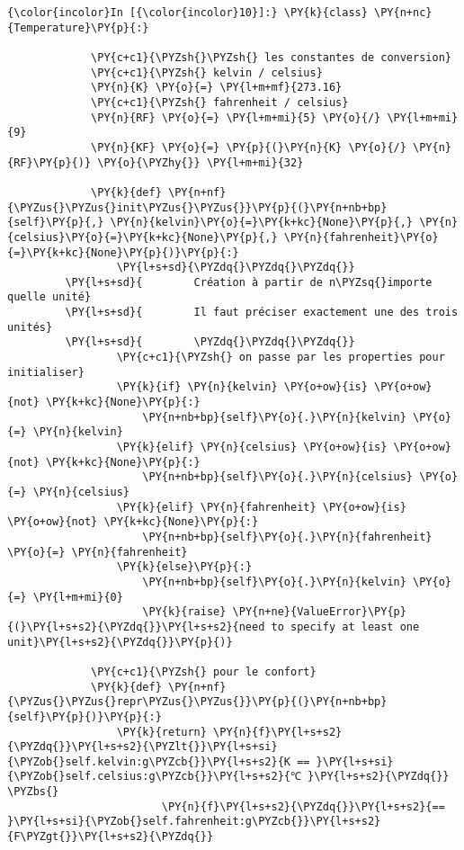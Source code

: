     \begin{Verbatim}[commandchars=\\\{\},frame=single,framerule=0.3mm,rulecolor=\color{cellframecolor}]
{\color{incolor}In [{\color{incolor}10}]:} \PY{k}{class} \PY{n+nc}{Temperature}\PY{p}{:}
         
             \PY{c+c1}{\PYZsh{}\PYZsh{} les constantes de conversion}
             \PY{c+c1}{\PYZsh{} kelvin / celsius}
             \PY{n}{K} \PY{o}{=} \PY{l+m+mf}{273.16}
             \PY{c+c1}{\PYZsh{} fahrenheit / celsius}
             \PY{n}{RF} \PY{o}{=} \PY{l+m+mi}{5} \PY{o}{/} \PY{l+m+mi}{9}
             \PY{n}{KF} \PY{o}{=} \PY{p}{(}\PY{n}{K} \PY{o}{/} \PY{n}{RF}\PY{p}{)} \PY{o}{\PYZhy{}} \PY{l+m+mi}{32}
         
             \PY{k}{def} \PY{n+nf}{\PYZus{}\PYZus{}init\PYZus{}\PYZus{}}\PY{p}{(}\PY{n+nb+bp}{self}\PY{p}{,} \PY{n}{kelvin}\PY{o}{=}\PY{k+kc}{None}\PY{p}{,} \PY{n}{celsius}\PY{o}{=}\PY{k+kc}{None}\PY{p}{,} \PY{n}{fahrenheit}\PY{o}{=}\PY{k+kc}{None}\PY{p}{)}\PY{p}{:}
                 \PY{l+s+sd}{\PYZdq{}\PYZdq{}\PYZdq{}}
         \PY{l+s+sd}{        Création à partir de n\PYZsq{}importe quelle unité}
         \PY{l+s+sd}{        Il faut préciser exactement une des trois unités}
         \PY{l+s+sd}{        \PYZdq{}\PYZdq{}\PYZdq{}}
                 \PY{c+c1}{\PYZsh{} on passe par les properties pour initialiser}
                 \PY{k}{if} \PY{n}{kelvin} \PY{o+ow}{is} \PY{o+ow}{not} \PY{k+kc}{None}\PY{p}{:}
                     \PY{n+nb+bp}{self}\PY{o}{.}\PY{n}{kelvin} \PY{o}{=} \PY{n}{kelvin}
                 \PY{k}{elif} \PY{n}{celsius} \PY{o+ow}{is} \PY{o+ow}{not} \PY{k+kc}{None}\PY{p}{:}
                     \PY{n+nb+bp}{self}\PY{o}{.}\PY{n}{celsius} \PY{o}{=} \PY{n}{celsius}
                 \PY{k}{elif} \PY{n}{fahrenheit} \PY{o+ow}{is} \PY{o+ow}{not} \PY{k+kc}{None}\PY{p}{:}
                     \PY{n+nb+bp}{self}\PY{o}{.}\PY{n}{fahrenheit} \PY{o}{=} \PY{n}{fahrenheit}
                 \PY{k}{else}\PY{p}{:}
                     \PY{n+nb+bp}{self}\PY{o}{.}\PY{n}{kelvin} \PY{o}{=} \PY{l+m+mi}{0}
                     \PY{k}{raise} \PY{n+ne}{ValueError}\PY{p}{(}\PY{l+s+s2}{\PYZdq{}}\PY{l+s+s2}{need to specify at least one unit}\PY{l+s+s2}{\PYZdq{}}\PY{p}{)}
         
             \PY{c+c1}{\PYZsh{} pour le confort}
             \PY{k}{def} \PY{n+nf}{\PYZus{}\PYZus{}repr\PYZus{}\PYZus{}}\PY{p}{(}\PY{n+nb+bp}{self}\PY{p}{)}\PY{p}{:}
                 \PY{k}{return} \PY{n}{f}\PY{l+s+s2}{\PYZdq{}}\PY{l+s+s2}{\PYZlt{}}\PY{l+s+si}{\PYZob{}self.kelvin:g\PYZcb{}}\PY{l+s+s2}{K == }\PY{l+s+si}{\PYZob{}self.celsius:g\PYZcb{}}\PY{l+s+s2}{℃ }\PY{l+s+s2}{\PYZdq{}} \PYZbs{}
                        \PY{n}{f}\PY{l+s+s2}{\PYZdq{}}\PY{l+s+s2}{== }\PY{l+s+si}{\PYZob{}self.fahrenheit:g\PYZcb{}}\PY{l+s+s2}{F\PYZgt{}}\PY{l+s+s2}{\PYZdq{}}
         

\end{Verbatim}
